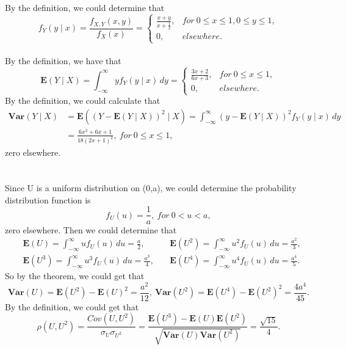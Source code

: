 \documentclass[10.5pt]{article}
\begin{document}
\section{}
By the definition, we could determine that $$f_Y(y\mid x)=\frac{f_{X,Y}(x,y)}{f_X(x)}=\begin{cases}
    \frac{x+y}{x+\frac{1}{2}},&for ~0\leqslant x\leqslant 1,0\leqslant y\leqslant 1,\\
    0,&elsewhere.
\end{cases}$$\\\indent
By the definition, we have that $$\mathbf{E}(Y\mid X)=\int_{-\infty}^{\infty}yf_Y(y\mid x)\,dy=\begin{cases}
    \frac{3x+2}{6x+3},&for ~0\leqslant x\leqslant 1,\\
    0,&elsewhere.
\end{cases}$$\indent
By the definition, we could calculate that $$\begin{aligned}
    \mathbf{Var}(Y\mid X)&=\mathbf{E}((Y-\mathbf{E}(Y\mid X))^2\mid X)=\int_{-\infty}^{\infty}(y-\mathbf{E}(Y\mid X))^2f_Y(y\mid x)\,dy\\
    &=\frac{6x^2+6x+1}{18(2x+1)^2},~for~0\leqslant x\leqslant1,
\end{aligned}$$\indent
zero elsewhere.

\section{}
Since U is a uniform distribution on (0,a), we could determine the probability distribution function is $$f_U(u)=\frac{1}{a},~for ~0<u<a,$$\indent
zero elsewhere. Then we could determine that $$\begin{aligned}
    &\mathbf{E}(U)=\int_{-\infty}^{\infty}uf_U(u)\,du=\frac{a}{2},~& &\mathbf{E}(U^2)=\int_{-\infty}^{\infty}u^2f_U(u)\,du=\frac{a^2}{3},\\
    &\mathbf{E}(U^3)=\int_{-\infty}^{\infty}u^3f_U(u)\,du=\frac{a^3}{4},~& &\mathbf{E}(U^4)=\int_{-\infty}^{\infty}u^4f_U(u)\,du=\frac{a^4}{5}.
\end{aligned}$$\indent
So by the theorem, we could get that $$\mathbf{Var}(U)=\mathbf{E}(U^2)-\mathbf{E}(U)^2=\frac{a^2}{12},~\mathbf{Var}(U^2)=\mathbf{E}(U^4)-\mathbf{E}(U^2)^2=\frac{4a^4}{45}.$$\indent
By the definition, we could get that $$\rho(U,U^2)=\frac{Cov(U,U^2)}{\sigma_U\sigma_{U^2}}=\frac{\mathbf{E}(U^3)-\mathbf{E}(U)\mathbf{E}(U^2)}{\sqrt{\mathbf{Var}(U)\mathbf{Var}(U^2)}}=\frac{\sqrt{15}}{4}.$$
\end{document}
